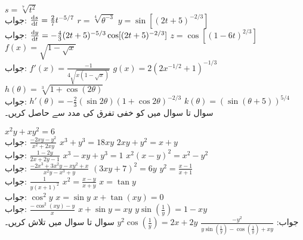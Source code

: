 $s=\sqrt[7]{t^2}$\\
جواب:\quad
$\tfrac{\dif s}{\dif t}=\tfrac{2}{7}t^{-5/7}$
$r=\sqrt[4]{\theta^{-3}}$
$y=\sin[(2t+5)^{-2/3}]$\\
جواب:\quad
$\tfrac{\dif y}{\dif t}=-\tfrac{4}{3}(2t+5)^{-5/3}\cos[(2t+5)^{-2/3}]$
$z=\cos[(1-6t)^{2/3}]$
$f(x)=\sqrt{1-\sqrt{x}}$\\
جواب:\quad
$f'(x)=\tfrac{-1}{4\sqrt{x(1-\sqrt{x})}}$
$g(x)=2(2x^{-1/2}+1)^{-1/3}$
$h(\theta)=\sqrt[3]{1+\cos(2\theta)}$\\
جواب:\quad
$h'(\theta)=-\tfrac{2}{3}(\sin 2\theta)(1+\cos 2\theta)^{-2/3}$
$k(\theta)=(\sin(\theta+5))^{5/4}$
\\
سوال  تا سوال  میں  کو خفی تفرق کی مدد سے حاصل کریں۔

$x^2y+xy^2=6$\\
جواب:\quad
$\tfrac{-2xy-y^2}{x^2+2xy}$
$x^3+y^3=18xy$
$2xy+y^2=x+y$\\
جواب:\quad
$\tfrac{1-2y}{2x+2y-1}$
$x^3-xy+y^3=1$
$x^2(x-y)^2=x^2-y^2$\\
جواب:\quad
$\tfrac{-2x^3+3x^2y-xy^2+x}{x^2y-x^3+y}$
$(3xy+7)^2=6y$
$y^2=\tfrac{x-1}{x+1}$\\
جواب:\quad
$\tfrac{1}{y(x+1)^2}$
$x^2=\tfrac{x-y}{x+y}$
$x=\tan y$\\
جواب:\quad
$\cos^2y$
$x=\sin y$
$x+\tan(xy)=0$\\
جواب:\quad
$\tfrac{-\cos^2(xy)-y}{x}$
$x+\sin y=xy$
$y\sin(\tfrac{1}{y})=1-xy$\\
جواب:\quad
$\tfrac{-y^2}{y\sin(\tfrac{1}{y})-\cos(\tfrac{1}{y})+xy}$
$y^2\cos(\tfrac{1}{y})=2x+2y$
سوال  تا سوال  میں  تلاش کریں۔

